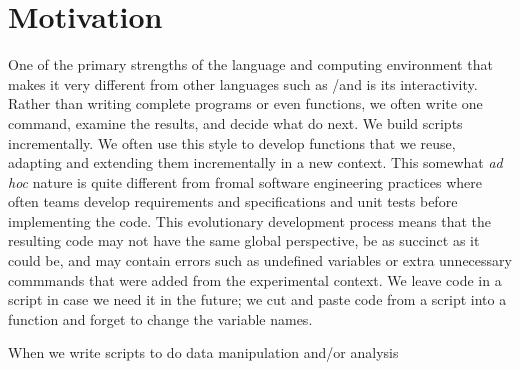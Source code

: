 \section{Motivation}
One of the primary strengths of the \R language and computing environment that makes it very
different from other languages such as \C/\Cpp and \Java is its interactivity.
Rather than writing complete programs or even functions, we often write one command, examine the
results, and decide what do next. We build scripts incrementally.  We often use this style to
develop functions that we reuse, adapting and extending them incrementally in a new context.
This somewhat \textit{ad hoc} nature is quite different from fromal software engineering
practices where often teams develop requirements and specifications and unit tests before
implementing the code.  This evolutionary development process means that the resulting
code may not have the same global perspective, be as succinct as it could be,
and may contain errors such as undefined variables or extra unnecessary commmands that were added
from the experimental context. We leave code in a script in case we need it in the future;
we cut and paste code from a script into a function and forget to change the variable names.




When we write \R scripts to do data manipulation and/or analysis

